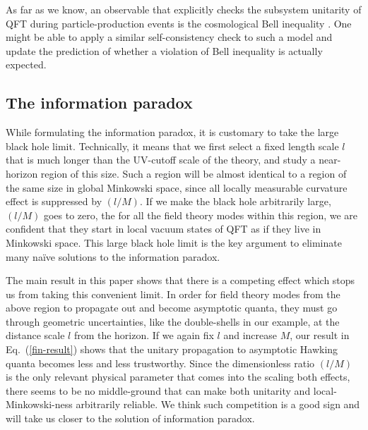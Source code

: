 \documentclass[aps,showpacs,onecolumn,floats,prd,superscriptaddress,nofootinbib]{revtex4-1}
\begin{document}
As far as we know, an observable that explicitly checks the subsystem unitarity of QFT during particle-production events is the cosmological Bell inequality \cite{Mal15}. 
One might be able to apply a similar self-consistency check to such a model and update the prediction of whether a violation of Bell inequality is actually expected.


\subsection{The information paradox}

While formulating the information paradox, it is customary to take the large black hole limit.
Technically, it means that we first select a fixed length scale $l$ that is much longer than the UV-cutoff scale of the theory, and study a near-horizon region of this size.
Such a region will be almost identical to a region of the same size in global Minkowski space, since all locally measurable curvature effect is suppressed by $(l/M)$.
If we make the black hole arbitrarily large, $(l/M)$ goes to zero, the for all the field theory modes within this region, we are confident that they start in local vacuum states of QFT as if they live in Minkowski space.
This large black hole limit is the key argument to eliminate many na\"ive solutions to the information paradox.

The main result in this paper shows that there is a competing effect which stops us from taking this convenient limit.
In order for field theory modes from the above region to propagate out and become asymptotic quanta, they must go through geometric uncertainties, like the double-shells in our example, at the distance scale $l$ from the horizon.
If we again fix $l$ and increase $M$, our result in Eq.~(\ref{fin-result}) shows that the unitary propagation to asymptotic Hawking quanta becomes less and less trustworthy. 
Since the dimensionless ratio $(l/M)$ is the only relevant physical parameter that comes into the scaling both effects, there seems to be no middle-ground that can make both unitarity and local-Minkowski-ness arbitrarily reliable.
We think such competition is a good sign and will take us closer to the solution of information paradox.
\end{document}
